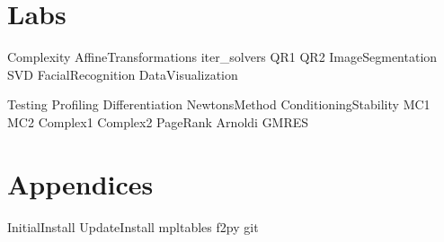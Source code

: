 \documentclass[nociteref]{SIAM-GH-book}
\begin{document}
\part{Labs} %
{Complexity}
{AffineTransformations}
{iter_solvers}
{QR1}
{QR2}
{ImageSegmentation}
{SVD}
{FacialRecognition}
{DataVisualization}

{Testing}
{Profiling}
{Differentiation}
{NewtonsMethod} %
{ConditioningStability}
{MC1}
{MC2}
{Complex1}
{Complex2}
{PageRank}
{Arnoldi}
{GMRES}


\part{Appendices} %
\begin{appendices}
{InitialInstall}
{UpdateInstall}
{mpltables}
{f2py}
{git}
\end{appendices}
\end{document}
